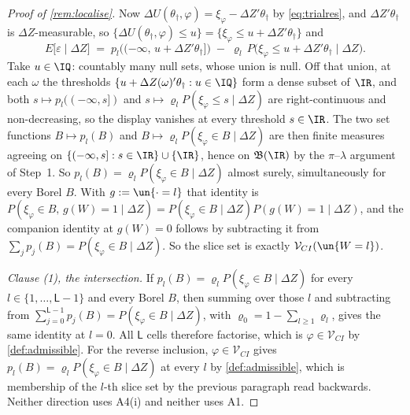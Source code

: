 \begin{proof}[Proof of \cref{rem:localise}]
Now $\Delta U(\theta_\dagger,\varphi)=\xi_\varphi-\Delta Z'\theta_\dagger$ by \eqref{eq:trialres}, and
$\Delta Z'\theta_\dagger$ is $\Delta Z$-measurable, so
$\{\Delta U(\theta_\dagger,\varphi)\le u\}=\{\xi_\varphi\le u+\Delta Z'\theta_\dagger\}$ and
\[
E\big[\varepsilon\mid\Delta Z\big]
\;=\;p_l\big((-\infty,\,u+\Delta Z'\theta_\dagger]\big)\;-\;\varrho_l\,P\big(\xi_\varphi\le u+\Delta Z'\theta_\dagger\mid\Delta Z\big).
\]
Take $u\in\IQ$: countably many null sets, whose union is null. Off that union, at each $\omega$ the
thresholds $\{u+\Delta Z(\omega)'\theta_\dagger:u\in\IQ\}$ form a dense subset of $\IR$, and both
$s\mapsto p_l((-\infty,s])$ and $s\mapsto\varrho_lP(\xi_\varphi\le s\mid\Delta Z)$ are right-continuous
and non-decreasing, so the display vanishes at every threshold $s\in\IR$. The two set functions
$B\mapsto p_l(B)$ and $B\mapsto\varrho_lP(\xi_\varphi\in B\mid\Delta Z)$ are then finite measures
agreeing on $\{(-\infty,s]:s\in\IR\}\cup\{\IR\}$, hence on $\mathfrak B(\IR)$ by the $\pi$--$\lambda$
argument of Step~1. So $p_l(B)=\varrho_lP(\xi_\varphi\in B\mid\Delta Z)$ almost surely, simultaneously
for every Borel $B$. With $g:=\un\{\cdot=l\}$ that identity is
$P(\xi_\varphi\in B,\,g(W)=1\mid\Delta Z)=P(\xi_\varphi\in B\mid\Delta Z)P(g(W)=1\mid\Delta Z)$, and
the companion identity at $g(W)=0$ follows by subtracting it from
$\sum_{j}p_j(B)=P(\xi_\varphi\in B\mid\Delta Z)$. So the slice set is exactly
$\mathcal V_{CI}(\un\{W=l\})$.

\emph{Clause \textup{(1)}, the intersection.} If $p_l(B)=\varrho_lP(\xi_\varphi\in B\mid\Delta Z)$ for
every $l\in\{1,\dots,\mathsf L-1\}$ and every Borel $B$, then summing over those $l$ and subtracting
from $\sum_{j=0}^{\mathsf L-1}p_j(B)=P(\xi_\varphi\in B\mid\Delta Z)$, with
$\varrho_0=1-\sum_{l\ge1}\varrho_l$, gives the same identity at $l=0$. All $\mathsf L$ cells therefore
factorise, which is $\varphi\in\mathcal V_{CI}$ by \cref{def:admissible}. For the reverse inclusion,
$\varphi\in\mathcal V_{CI}$ gives $p_l(B)=\varrho_lP(\xi_\varphi\in B\mid\Delta Z)$ at every $l$ by
\cref{def:admissible}, which is membership of the $l$-th slice set by the previous paragraph read
backwards. Neither direction uses A4(i) and neither uses A1.


\end{proof}
